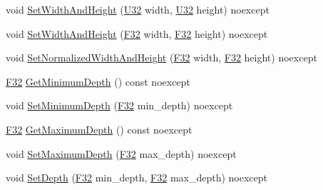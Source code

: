 \begin{DoxyCompactItemize}
\item 
void \hyperlink{classmage_1_1_viewport_ab3b8cdbc0b6b6e1c34bab0a4f05e0d52}{Set\+Width\+And\+Height} (\hyperlink{namespacemage_a41c104c036fba3756a74e19f793eeaa1}{U32} width, \hyperlink{namespacemage_a41c104c036fba3756a74e19f793eeaa1}{U32} height) noexcept
\item 
void \hyperlink{classmage_1_1_viewport_ab45df0ab7757f95d825fd724db663af5}{Set\+Width\+And\+Height} (\hyperlink{namespacemage_aa97e833b45f06d60a0a9c4fc22ae02c0}{F32} width, \hyperlink{namespacemage_aa97e833b45f06d60a0a9c4fc22ae02c0}{F32} height) noexcept
\item 
void \hyperlink{classmage_1_1_viewport_ae456cd1a570d41bff6939d29722fa8ca}{Set\+Normalized\+Width\+And\+Height} (\hyperlink{namespacemage_aa97e833b45f06d60a0a9c4fc22ae02c0}{F32} width, \hyperlink{namespacemage_aa97e833b45f06d60a0a9c4fc22ae02c0}{F32} height) noexcept
\item 
\hyperlink{namespacemage_aa97e833b45f06d60a0a9c4fc22ae02c0}{F32} \hyperlink{classmage_1_1_viewport_a27e673433e78f5382716e670b88d2bb1}{Get\+Minimum\+Depth} () const noexcept
\item 
void \hyperlink{classmage_1_1_viewport_a7e5ea28ca50be25d48668bd8ce4995d5}{Set\+Minimum\+Depth} (\hyperlink{namespacemage_aa97e833b45f06d60a0a9c4fc22ae02c0}{F32} min\+\_\+depth) noexcept
\item 
\hyperlink{namespacemage_aa97e833b45f06d60a0a9c4fc22ae02c0}{F32} \hyperlink{classmage_1_1_viewport_a1f6d41353b7f78afbd6b548d94c13752}{Get\+Maximum\+Depth} () const noexcept
\item 
void \hyperlink{classmage_1_1_viewport_a5f3d52bcaeaa3048d4da86e363131455}{Set\+Maximum\+Depth} (\hyperlink{namespacemage_aa97e833b45f06d60a0a9c4fc22ae02c0}{F32} max\+\_\+depth) noexcept
\item 
void \hyperlink{classmage_1_1_viewport_a15a328f7feb3f17dc1c9af47f30dce3b}{Set\+Depth} (\hyperlink{namespacemage_aa97e833b45f06d60a0a9c4fc22ae02c0}{F32} min\+\_\+depth, \hyperlink{namespacemage_aa97e833b45f06d60a0a9c4fc22ae02c0}{F32} max\+\_\+depth) noexcept
\end{DoxyCompactItemize}
